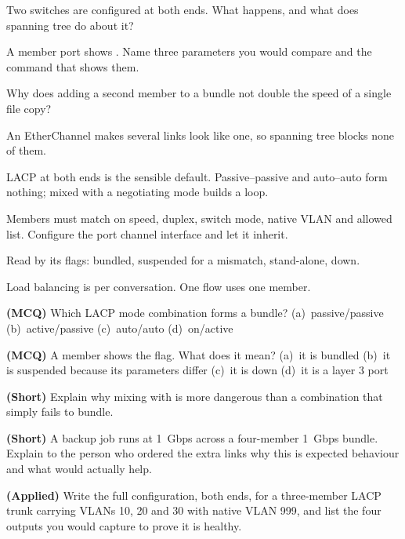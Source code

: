 \begin{checkpoint}
\begin{tightnum}
  \item Two switches are configured  at both
        ends. What happens, and what does spanning tree do about it?
  \item A member port shows . Name three parameters you would compare
        and the command that shows them.
  \item Why does adding a second member to a bundle not double the speed of a
        single file copy?
\end{tightnum}
\end{checkpoint}

\begin{chaptersummary}
\begin{tight}
  \item An EtherChannel makes several links look like one, so spanning tree
        blocks none of them.
  \item LACP  at both ends is the sensible default. Passive--passive
        and auto--auto form nothing;  mixed with a negotiating mode
        builds a loop.
  \item Members must match on speed, duplex, switch mode, native VLAN and allowed
        list. Configure the port channel interface and let it inherit.
  \item Read  by its flags:  bundled,
         suspended for a mismatch,  stand-alone,  down.
  \item Load balancing is per conversation. One flow uses one member.
\end{tight}
\end{chaptersummary}

\begin{reviewq}
  \item \textbf{(MCQ)} Which LACP mode combination forms a bundle?
        (a)~passive/passive (b)~active/passive (c)~auto/auto (d)~on/active
  \item \textbf{(MCQ)} A member shows the  flag. What does it mean?
        (a)~it is bundled (b)~it is suspended because its parameters differ
        (c)~it is down (d)~it is a layer 3 port
  \item \textbf{(Short)} Explain why mixing  with  is more
        dangerous than a combination that simply fails to bundle.
  \item \textbf{(Short)} A backup job runs at 1~Gbps across a four-member 1~Gbps
        bundle. Explain to the person who ordered the extra links why this is
        expected behaviour and what would actually help.
  \item \textbf{(Applied)} Write the full configuration, both ends, for a
        three-member LACP trunk carrying VLANs 10, 20 and 30 with native VLAN
        999, and list the four  outputs you would capture to prove it
        is healthy.
\end{reviewq}
